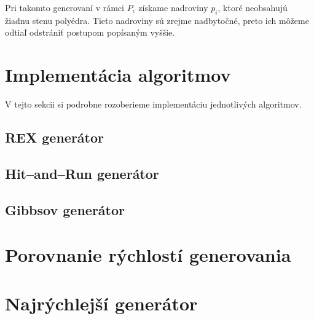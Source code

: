 Pri takomto generovaní v rámci $P_c$ získame nadroviny $p_i$, ktoré neobsahujú žiadnu stenu polyédra. Tieto nadroviny sú zrejme nadbytočné, preto ich môžeme odtiaľ odstrániť postupom popísaným vyššie.

\section{Implementácia algoritmov}

V tejto sekcii si podrobne rozoberieme implementáciu jednotlivých algoritmov.

\subsection{REX generátor}

\subsection{Hit--and--Run generátor}

\subsection{Gibbsov generátor}

\section{Porovnanie rýchlostí generovania}

\section{Najrýchlejší generátor}